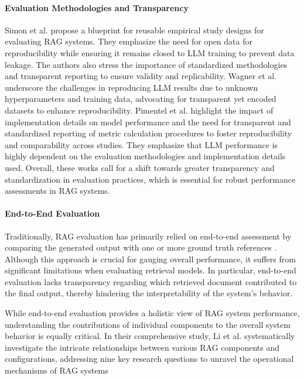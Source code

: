 \paragraph{Evaluation Methodologies and Transparency}
Simon et al.\cite{Simon.10112024} propose a blueprint for reusable empirical study designs for evaluating RAG systems. They emphasize the need for open data for reproducibility while ensuring it remains closed to LLM training to prevent data leakage. The authors also stress the importance of standardized methodologies and transparent reporting to ensure validity and replicability. Wagner et al.\cite{Wagner.12.11.2024} underscore the challenges in reproducing LLM results due to unknown hyperparameters and training data, advocating for transparent yet encoded datasets to enhance reproducibility. Pimentel et al.\cite{M.A.Pimentel.2024} highlight the impact of implementation details on model performance and the need for transparent and standardized reporting of metric calculation procedures to foster reproducibility and comparability across studies. They emphasize that LLM performance is highly dependent on the evaluation methodologies and implementation details used. Overall, these works call for a shift towards greater transparency and standardization in evaluation practices, which is essential for robust performance assessments in RAG systems.

\paragraph{End-to-End Evaluation}

Traditionally, RAG evaluation has primarily relied on end-to-end assessment by comparing the generated output with one or more ground truth references \cite{Salemi.2024}. Although this approach is crucial for gauging overall performance, it suffers from significant limitations when evaluating retrieval models. In particular, end-to-end evaluation lacks transparency regarding which retrieved document contributed to the final output, thereby hindering the interpretability of the system's behavior. 

While end-to-end evaluation provides a holistic view of RAG system performance, understanding the contributions of individual components to the overall system behavior is equally critical. In their comprehensive study, Li et al. \cite{Li.13.01.2025} systematically investigate the intricate relationships between various RAG components and configurations, addressing nine key research questions to unravel the operational mechanisms of RAG systems

